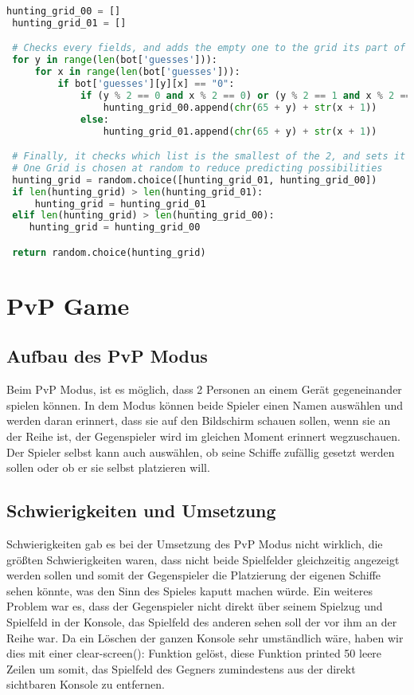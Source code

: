 \documentclass{article}
\begin{document}
\begin{lstlisting}[language=Python, caption = Herstellung der zwei möglich Grids und deren Vergleich]
 hunting_grid_00 = []
 hunting_grid_01 = []

 # Checks every fields, and adds the empty one to the grid its part of
 for y in range(len(bot['guesses'])):
     for x in range(len(bot['guesses'])):
         if bot['guesses'][y][x] == "0":
             if (y % 2 == 0 and x % 2 == 0) or (y % 2 == 1 and x % 2 == 1):
                 hunting_grid_00.append(chr(65 + y) + str(x + 1))
             else:
                 hunting_grid_01.append(chr(65 + y) + str(x + 1))

 # Finally, it checks which list is the smallest of the 2, and sets it as our hunting grid
 # One Grid is chosen at random to reduce predicting possibilities
 hunting_grid = random.choice([hunting_grid_01, hunting_grid_00])
 if len(hunting_grid) > len(hunting_grid_01):
     hunting_grid = hunting_grid_01
 elif len(hunting_grid) > len(hunting_grid_00):
    hunting_grid = hunting_grid_00

 return random.choice(hunting_grid)
\end{lstlisting}
\section{PvP Game}
\subsection{Aufbau des PvP Modus}
\par
    Beim PvP Modus, ist es möglich, dass 2 Personen an einem Gerät gegeneinander spielen können. In dem Modus können beide Spieler einen Namen auswählen und werden daran erinnert, dass sie auf den Bildschirm schauen sollen, wenn sie an der Reihe ist, der Gegenspieler wird im gleichen Moment erinnert wegzuschauen. Der Spieler selbst kann auch auswählen, ob seine Schiffe zufällig gesetzt werden sollen oder ob er sie selbst platzieren will.
\subsection{Schwierigkeiten und Umsetzung}
\par
    Schwierigkeiten gab es bei der Umsetzung des PvP Modus nicht wirklich, die größten Schwierigkeiten waren, dass nicht beide Spielfelder gleichzeitig angezeigt werden sollen und somit der Gegenspieler die Platzierung der eigenen Schiffe sehen könnte, was den Sinn des Spieles kaputt machen würde. Ein weiteres Problem war es, dass der Gegenspieler nicht direkt über seinem Spielzug und Spielfeld in der Konsole, das Spielfeld des anderen sehen soll der vor ihm an der Reihe war. Da ein Löschen der ganzen Konsole sehr umständlich wäre, haben wir dies mit einer clear-screen(): Funktion gelöst, diese Funktion printed 50 leere Zeilen um somit, das Spielfeld des Gegners zumindestens aus der direkt sichtbaren Konsole zu entfernen.
\end{document}
